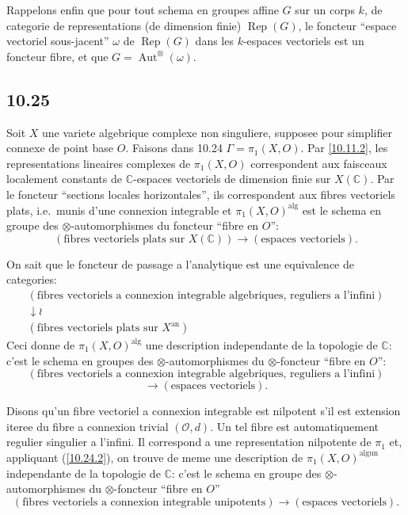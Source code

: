 \documentclass[12pt,a4paper]{article}
\theoremstyle{plain}
\theoremstyle{definition}
\theoremstyle{remark}
\DeclareMathOperator{\Aut}{Aut}
\DeclareMathOperator{\Rep}{Rep}
\newcommand{\C}{\mathbb{C}}
\newcommand{\alg}{\mathrm{alg}}
\newcommand{\un}{\mathrm{un}}
\begin{document}
Rappelons enfin que pour tout schema en groupes affine $G$ sur un corps $k$, de categorie de representations (de dimension finie) $\Rep(G)$, le foncteur ``espace vectoriel sous-jacent'' $\omega$ de $\Rep(G)$ dans les $k$-espaces vectoriels est un foncteur fibre, et que $G = \Aut^{\otimes}(\omega)$.

\subsection*{10.25}

Soit $X$ une variete algebrique complexe non singuliere, supposee pour simplifier connexe de point base $O$. Faisons dans 10.24 $\Gamma = \pi_1(X, O)$. Par \ref{10.11.2}, les representations lineaires complexes de $\pi_1(X, O)$ correspondent aux faisceaux localement constants de $\C$-espaces vectoriels de dimension finie sur $X(\C)$. Par le foncteur ``sections locales horizontales'', ils correspondent aux fibres vectoriels plats, i.e.~munis d'une connexion integrable et $\pi_1(X, O)^{\alg}$ est le schema en groupe des $\otimes$-automorphismes du foncteur ``fibre en $O$'':
$$(\text{fibres vectoriels plats sur } X(\C)) \longrightarrow (\text{espaces vectoriels}).$$

On sait que le foncteur de passage a l'analytique est une equivalence de categories:
$$\begin{array}{c}
(\text{fibres vectoriels a connexion integrable algebriques, reguliers a l'infini}) \\
\downarrow \wr \\
(\text{fibres vectoriels plats sur } X^{\mathrm{an}})
\end{array}$$
Ceci donne de $\pi_1(X, O)^{\alg}$ une description independante de la topologie de $\C$: c'est le schema en groupes des $\otimes$-automorphismes du $\otimes$-foncteur ``fibre en $O$'':
$$(\text{fibres vectoriels a connexion integrable algebriques, reguliers a l'infini})$$
$$\longrightarrow (\text{espaces vectoriels}).$$

Disons qu'un fibre vectoriel a connexion integrable est nilpotent s'il est extension iteree du fibre a connexion trivial $(\mathcal{O}, d)$. Un tel fibre est automatiquement regulier singulier a l'infini. Il correspond a une representation nilpotente de $\pi_1$ et, appliquant (\ref{10.24.2}), on trouve de meme une description de $\pi_1(X, O)^{\alg \un}$ independante de la topologie de $\C$: c'est le schema en groupe des $\otimes$-automorphismes du $\otimes$-foncteur ``fibre en $O$''
$$(\text{fibres vectoriels a connexion integrable unipotents}) \longrightarrow (\text{espaces vectoriels}).$$
\end{document}
